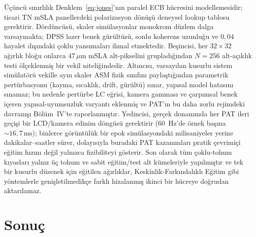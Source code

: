 \documentclass[journal]{IEEEtran}
\begin{document}
\"U\c{c}\"unc\"u s\i{}n\i{}rl\i{}l\i{}k Denklem~\eqref{eq:jones}'n\i{}n paralel ECB h\"ucresini modellemesidir; ticari TN mSLA panellerdeki polarizasyon d\"on\"u\c{s}\"u \cite{lu1990lctv} deneysel lookup tablosu gerektirir. D\"ord\"unc\"us\"u, skaler sim\"ulasyonlar monokrom d\"uzlem dalga varsaymakta; DPSS lazer benek g\"ur\"ult\"us\"u, sonlu koherens uzunlu\u{g}u ve $0{,}04$ hayalet d\i{}\c{s}\i{}ndaki \c{c}oklu yans\i{}malar\i{} ihmal etmektedir. Be\c{s}incisi, her $32\times 32$ a\u{g}\i{}rl\i{}k blo\u{g}u onlarca $47\,\mu\text{m}$ mSLA alt-pikselini gruplad\i{}\u{g}\i{}ndan $N=256$ alt-a\c{c}\i{}kl\i{}k testi \"ol\c{c}eklenmi\c{s} bir vekil niteli\u{g}indedir. Alt\i{}nc\i{}s\i{}, varsay\i{}lan kusurlu sistem sim\"ulat\"or\"u vekille ayn\i{} skaler ASM fizik s\i{}n\i{}f\i{}n\i{} payla\c{s}t\i{}\u{g}\i{}ndan parametrik pert\"urbasyonu (kayma, s\i{}cakl\i{}k, drift, g\"ur\"ult\"u) s\i{}nar, yap\i{}sal model hatas\i{}n\i{} s\i{}namaz; bu nedenle pert\"urbe LC e\u{g}risi, kamera gammas\i{} ve \c{c}arp\i{}msal benek i\c{c}eren yap\i{}sal-uyumsuzluk varyant\i{} eklenmi\c{s} ve PAT'\i{}n bu daha zorlu rejimdeki davran\i{}\c{s}\i{} B\"ol\"um~IV'te raporlanm\i{}\c{s}t\i{}r. Yedincisi, ger\c{c}ek donan\i{}mda her PAT ileri ge\c{c}i\c{s}i bir LCD/kamera edinim d\"ong\"us\"u gerektirir (60~Hz'de \"ornek ba\c{s}\i{}na $\sim 16{,}7\,\text{ms}$); binlerce g\"or\"unt\"ul\"uk bir epok sim\"ulasyondaki milisaniyeler yerine dakikalar--saatler s\"urer, dolay\i{}s\i{}yla buradaki PAT kazan\i{}mlar\i{} pratik \c{c}evrimi\c{c}i e\u{g}itim h\i{}z\i{}n\i{} de\u{g}il yaln\i{}zca fizibiliteyi g\"osterir. Son olarak t\"um \c{c}oklu-tohum k\i{}yaslar\i{} yaln\i{}z \"u\c{c} tohum ve sabit e\u{g}itim/test alt k\"umeleriyle yap\i{}lm\i{}\c{s}t\i{}r ve tek bir kusurlu d\"uzenek i\c{c}in e\u{g}itilen a\u{g}\i{}rl\i{}klar, Keskinlik-Fark\i{}ndal\i{}kl\i{} E\u{g}itim \cite{sat2026pnn} gibi y\"ontemlerle geni\c{s}letilmedik\c{c}e farkl\i{} hizalanm\i{}\c{s} ikinci bir h\"ucreye do\u{g}rudan aktar\i{}lamaz.

\section{Sonu\c{c}}
\end{document}
